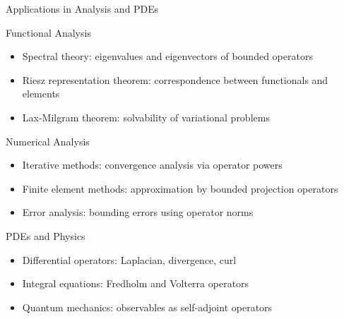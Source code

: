 \documentclass[aspectratio=169,10pt]{beamer}
\begin{document}
\begin{frame}{Applications in Analysis and PDEs}
    \begin{block}{Functional Analysis}
        \begin{itemize}
            \item Spectral theory: eigenvalues and eigenvectors of bounded operators
            \item Riesz representation theorem: correspondence between functionals and elements
            \item Lax-Milgram theorem: solvability of variational problems
        \end{itemize}
    \end{block}

    \begin{block}{Numerical Analysis}
        \begin{itemize}
            \item Iterative methods: convergence analysis via operator powers
            \item Finite element methods: approximation by bounded projection operators
            \item Error analysis: bounding errors using operator norms
        \end{itemize}
    \end{block}

    \begin{block}{PDEs and Physics}
        \begin{itemize}
            \item Differential operators: Laplacian, divergence, curl
            \item Integral equations: Fredholm and Volterra operators
            \item Quantum mechanics: observables as self-adjoint operators
        \end{itemize}
    \end{block}
\end{frame}
\end{document}
